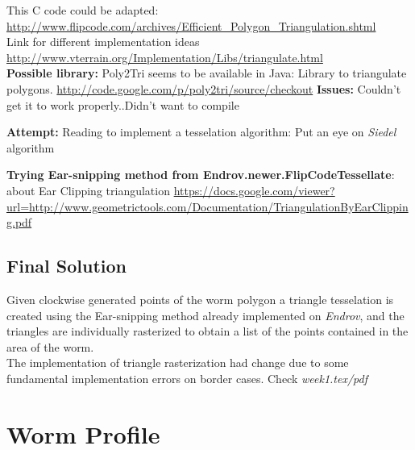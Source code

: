 \documentclass{article}
\begin{document}
This C code could be adapted: \url{http://www.flipcode.com/archives/Efficient_Polygon_Triangulation.shtml}\\
Link for different implementation ideas \url{http://www.vterrain.org/Implementation/Libs/triangulate.html}\\

\textbf{Possible library: }Poly2Tri seems to be available in Java: Library
to triangulate polygons. \url{http://code.google.com/p/poly2tri/source/checkout}
\textbf{Issues: } Couldn't get it to work properly..Didn't want to compile

\textbf{Attempt: }Reading to implement a tesselation algorithm: Put
an eye on \emph{Siedel} algorithm

\textbf{Trying Ear-snipping method from Endrov.newer.FlipCodeTessellate}:
about Ear Clipping triangulation \url{https://docs.google.com/viewer?url=http://www.geometrictools.com/Documentation/TriangulationByEarClipping.pdf}

\subsection{Final Solution}
Given clockwise generated points of the worm polygon a triangle tesselation
is created using the Ear-snipping method already implemented on
\emph{Endrov}, and the triangles are individually rasterized to obtain a list
of the points contained in the area of the worm.\\

The implementation of triangle rasterization had change due to some fundamental
implementation errors on border cases. Check \emph{week1.tex/pdf}

\section{Worm Profile}
\end{document}
